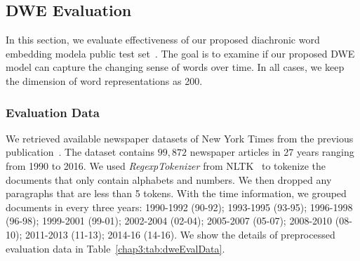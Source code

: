 \subsection{DWE Evaluation}

In this section, we evaluate effectiveness of our proposed diachronic word embedding modela public test set~\cite{yao2018dynamic}.
The goal is to examine if our proposed DWE model can capture the changing sense of words over time.
In all cases, we keep the dimension of word representations as 200.

\subsubsection{Evaluation Data}
We retrieved available newspaper datasets of New York Times from the previous publication~\cite{yao2018dynamic}.
The dataset contains $99,872$ newspaper articles in 27 years ranging from 1990 to 2016.
We used \textit{RegexpTokenizer} from NLTK~\cite{bird2004nltk} to tokenize the documents that only contain alphabets and numbers.
We then dropped any paragraphs that are less than 5 tokens.
With the time information, we grouped documents in every three years: 1990-1992 (90-92); 1993-1995 (93-95); 1996-1998 (96-98); 1999-2001 (99-01); 2002-2004 (02-04); 2005-2007 (05-07); 2008-2010 (08-10); 2011-2013 (11-13); 2014-16 (14-16). 
We show the details of preprocessed evaluation data in Table~\ref{chap3:tab:dweEvalData}.


\begin{table}[htp]
\centering
{}
\caption{Data stats across each temporal and the general domain, where $\#doc$ is the number of documents, $\#uw$ refers to the unique numbers of words in the domain and $\#awpd$ means the average number of words per document. We filtered out the words if their frequency are smaller than 5 in the general domain.}
\label{chap3:tab:dweEvalData}
\end{table}


